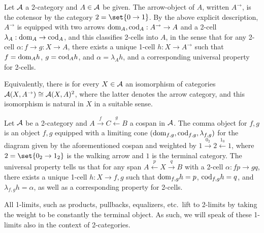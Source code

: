 \documentclass[../thesis.tex]{subfiles}
\begin{document}
\begin{example}
  Let ${\mathcal{A}}$ a 2-category and $A \in {\mathcal{A}}$ be given. The arrow-object of $A$, written $A^\to$, is the cotensor by the category
  $2 = \set{0 \to 1}$. By the above explicit description, $A^\to$ is equipped with two arrows ${\mathrm{dom}}_A,{\mathrm{cod}}_A : A^\to \to A$ and
  a 2-cell $\lambda_A : {\mathrm{dom}}_A \to {\mathrm{cod}}_A$, and this classifies 2-cells into $A$, in the sense that for any 2-cell $\alpha
  : f \to g : X \to A$, there exists a unique 1-cell $h : X \to A^\to$ such that $f = {\mathrm{dom}}_A h$, $g = {\mathrm{cod}}_A h$, and
  $\alpha = \lambda_A h$, and a corresponding universal property for 2-cells.

  Equivalently, there is for every $X \in {\mathcal{A}}$ an isomorphism of categories ${\mathcal{A}}(X,A^\to) \cong {\mathcal{A}}(X,A)^2$,
  where the latter denotes the arrow category, and this isomorphism is natural in $X$ in a suitable sense.
\end{example}

\begin{example}
  Let ${\mathcal{A}}$ be a 2-category and $A \xrightarrow{f} C \xleftarrow{g} B$ a cospan in ${\mathcal{A}}$. The comma object for $f,g$ is an
  object $f \comma g$ equipped with a limiting cone $({\mathrm{dom}}_{f,g}, {\mathrm{cod}}_{f,g}, \lambda_{f,g})$ for the diagram given by the
  aforementioned cospan and weighted by $1 \xrightarrow{0_2} 2 \xleftarrow{1_0} 1$, where $2 = \set{0_2 \to 1_2}$ is the
  walking arrow and $1$ is the terminal category. The universal property tells us that for any span $A \xleftarrow{p} X
  \xrightarrow{q} B$ with a 2-cell $\alpha : fp \to gq$, there exists a unique 1-cell $h : X \to f \comma g$ such that
  ${\mathrm{dom}}_{f,g} h = p$, ${\mathrm{cod}}_{f,g} h = q$, and $\lambda_{f,g} h = \alpha$, as well as a corresponding property for 2-cells.
\end{example}

\begin{example}[1-limits]
  All 1-limits, such as products, pullbacks, equalizers, etc.\ lift to 2-limits by taking the weight to be constantly the
  terminal object. As such, we will speak of these 1-limits also in the context of 2-categories. 
\end{example}
\end{document}
